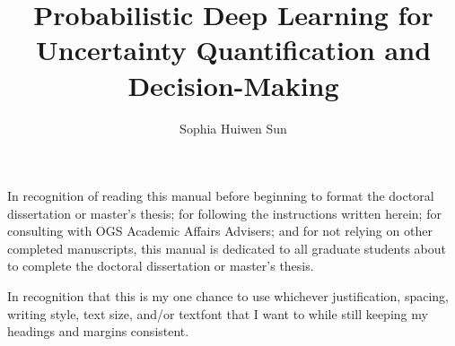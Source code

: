 \documentclass[12pt]{ucsddissertation}
\title{Probabilistic Deep Learning for Uncertainty Quantification and Decision-Making}
\author{Sophia Huiwen Sun}
\begin{document}
\frontmatter
\maketitle
\makecopyright
\makesignature
\begin{dedication}
\setsinglespacing
\raggedright %
\parindent0pt\parskip\baselineskip
In recognition of reading this manual before beginning to format the
doctoral dissertation or master's thesis; for following the
instructions written herein; for consulting with OGS Academic Affairs
Advisers; and for not relying on other completed manuscripts, this
manual is dedicated to all graduate students about to complete the
doctoral dissertation or master's thesis.

In recognition that this is my one chance to use whichever
justification, spacing, writing style, text size, and/or textfont that
I want to while still keeping my headings and margins consistent.
\end{dedication}
\end{document}
